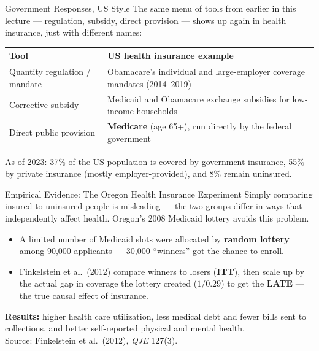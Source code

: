\documentclass[11pt,aspectratio=169]{beamer}
\newcommand{\srcnote}[1]{{\footnotesize\color{wugray}Source: #1}}
\begin{document}
\begin{frame}{Government Responses, US Style}
  The same menu of tools from earlier in this lecture --- regulation, subsidy, direct provision --- shows up again in health insurance, just with different names:
  \begin{center}
  \small
  \begin{tabular}{@{}p{3.6cm}p{7.5cm}@{}}
    \toprule
    \textbf{Tool} & \textbf{US health insurance example} \\
    \midrule
    Quantity regulation / mandate & Obamacare's individual and large-employer coverage mandates (2014--2019) \\[0.3em]
    Corrective subsidy & Medicaid and Obamacare exchange subsidies for low-income households \\[0.3em]
    Direct public provision & \textbf{Medicare} (age 65+), run directly by the federal government \\
    \bottomrule
  \end{tabular}
  \end{center}
  \vspace{0.3em}
  \small As of 2023: 37\% of the US population is covered by government insurance, 55\% by private insurance (mostly employer-provided), and 8\% remain uninsured.
\end{frame}

\begin{frame}{Empirical Evidence: The Oregon Health Insurance Experiment}
  Simply comparing insured to uninsured people is misleading --- the two groups differ in ways that independently affect health. Oregon's 2008 Medicaid lottery avoids this problem.
  \begin{itemize}
    \item A limited number of Medicaid slots were allocated by \textbf{random lottery} among 90{,}000 applicants --- 30{,}000 ``winners'' got the chance to enroll.
    \item Finkelstein et al.\ (2012) compare winners to losers (\textbf{ITT}), then scale up by the actual gap in coverage the lottery created ($1/0.29$) to get the \textbf{LATE} --- the true causal effect of insurance.
  \end{itemize}
  \textbf{Results:} higher health care utilization, less medical debt and fewer bills sent to collections, and better self-reported physical and mental health.\\
  \srcnote{Finkelstein et al.\ (2012), \emph{QJE} 127(3).}
\end{frame}
\end{document}
